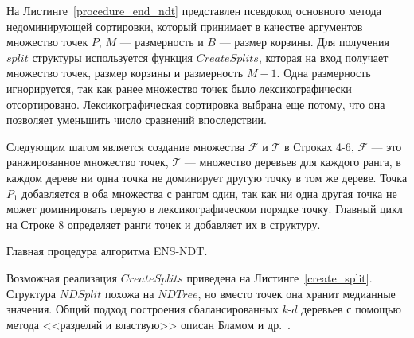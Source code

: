 На Листинге~\ref{procedure_end_ndt} представлен псевдокод основного метода недоминирующей сортировки, который принимает в качестве аргументов множество точек $P$, $M$ {---} размерность и $B$ {---} размер корзины. Для получения $split$ структуры используется функция $CreateSplits$, которая на вход получает множество точек, размер корзины и размерность $M-1$. Одна размерность игнорируется, так как ранее множество точек было лексикографически отсортировано. Лексикографическая сортировка выбрана еще потому, что она позволяет уменьшить число сравнений впоследствии.

Следующим шагом является создание множества $\mathcal{F}$ и $\mathcal{T}$ в Строках 4-6, $\mathcal{F}$ {---} это ранжированное множество точек, $\mathcal{T}$ {---} множество деревьев для каждого ранга, в каждом дереве ни одна точка не доминирует другую точку в том же дереве. Точка $P_1$ добавляется в оба множества с рангом один, так как ни одна другая точка не может доминировать первую в лексикографическом порядке точку. Главный цикл на Строке 8 определяет ранги точек и добавляет их в структуру.

\begin{algorithm}
\begin{algorithmic}[1]
            \EndIf
        \EndIf
    \EndFor
\EndProcedure
\end{algorithmic}
\caption{Главная процедура алгоритма ENS-NDT.}
\label{procedure_end_ndt}
\end{algorithm}


Возможная реализация $CreateSplits$ приведена на Листинге~\ref{create_split}. Структура $NDSplit$ похожа на $NDTree$, но вместо точек она хранит медианные значения. Общий подход построения сбалансированных $k$-$d$ деревьев с помощью метода <<разделяй и властвую>> описан Бламом и др.~\cite{Blum}.

